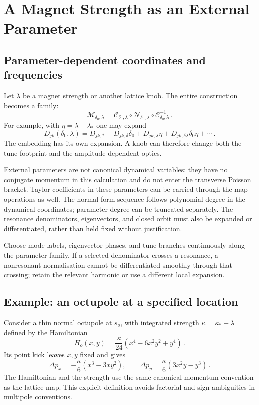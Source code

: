 \section{A Magnet Strength as an External Parameter}

\subsection{Parameter-dependent coordinates and frequencies}

Let $\lambda$ be a magnet strength or another lattice knob.  The entire
construction becomes a family:
\begin{equation}\label{eq:nnf-parameter-family}
    \mathcal M_{\delta_0,\lambda} = \mathcal C_{\delta_0,\lambda}\circ
    \mathcal N_{\delta_0,\lambda}\circ
    \mathcal C_{\delta_0,\lambda}^{-1}\,.
\end{equation}
For example, with $\eta = \lambda-\lambda_*$ one may expand
\begin{equation}
    D_{jk}(\delta_0,\lambda) = D_{jk,*} + D_{jk,\delta}\delta_0 + D_{jk,\lambda}\eta + D_{jk,\delta\lambda}\delta_0\eta + \cdots\,.
\end{equation}
The embedding has its own expansion.  A knob can therefore change both
the tune footprint and the amplitude-dependent optics.

External parameters are not canonical dynamical variables: they have no
conjugate momentum in this calculation and do not enter the transverse
Poisson bracket.  Taylor coefficients in these parameters can be carried
through the map operations as well.  The normal-form sequence follows
polynomial degree in the dynamical coordinates; parameter degree can be
truncated separately.  The resonance denominators, eigenvectors, and
closed orbit must also be expanded or differentiated, rather than held
fixed without justification.

Choose mode labels, eigenvector phases, and tune branches continuously
along the parameter family.  If a selected denominator crosses a
resonance, a nonresonant normalisation cannot be differentiated smoothly
through that crossing; retain the relevant harmonic or use a different
local expansion.


\subsection{Example: an octupole at a specified location}

Consider a thin normal octupole at $s_o$, with integrated strength
$\kappa = \kappa_* + \lambda$ defined by the Hamiltonian
\begin{equation}\label{eq:nnf-octupole-hamiltonian}
    H_o(x,y) = \frac{\kappa}{24}(x^4-6x^2y^2 + y^4)\,.
\end{equation}
Its point kick leaves $x,y$ fixed and gives
\begin{equation}
    \Delta p_x = -\frac{\kappa}{6}(x^3-3xy^2),\qquad
    \Delta p_y = \frac{\kappa}{6}(3x^2y-y^3)\,.
\end{equation}
The Hamiltonian and the strength use the same canonical momentum
convention as the lattice map.  This explicit definition avoids
factorial and sign ambiguities in multipole conventions.

